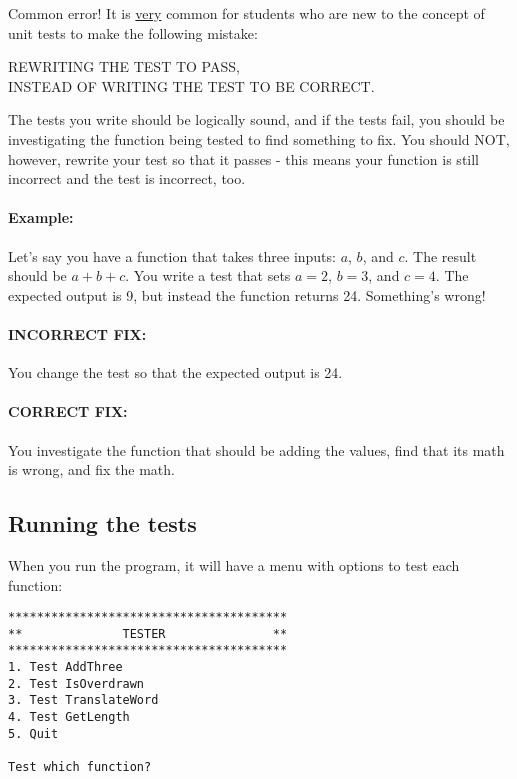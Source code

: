 \begin{error}{Common error!}
    It is \underline{very} common for students who are new to the concept of
    unit tests to make the following mistake:

    \begin{center}
        REWRITING THE TEST TO PASS, \\ INSTEAD OF WRITING THE TEST TO BE CORRECT.
    \end{center}

    The tests you write should be logically sound, and if the tests fail,
    you should be investigating the function being tested to find something to fix.
    You should NOT, however, rewrite your test so that it passes - this means
    your function is still incorrect and the test is incorrect, too.

    \paragraph{Example:}
        Let's say you have a function that takes three inputs: $a$, $b$, and $c$.
        The result should be $a + b + c$.
        You write a test that sets $a = 2$, $b = 3$, and $c = 4$. The expected
        output is 9, but instead the function returns 24. Something's wrong!

        \paragraph{INCORRECT FIX:} You change the test so that the expected output is 24.

        \paragraph{CORRECT FIX:} You investigate the function that should be adding
        the values, find that its math is wrong, and fix the math.
\end{error}

\subsection{Running the tests}

When you run the program, it will have a menu with options to
test each function:

\begin{lstlisting}[style=output]
***************************************
**              TESTER               **
***************************************
1. Test AddThree
2. Test IsOverdrawn
3. Test TranslateWord
4. Test GetLength
5. Quit

Test which function? 
\end{lstlisting}

